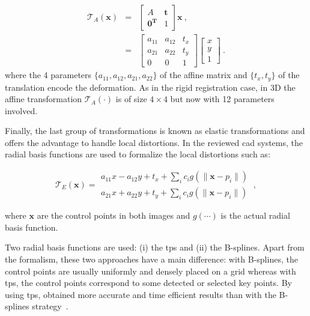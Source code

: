 \begin{eqnarray}
	\mathcal{T}_A(\mathbf{x}) & = & \begin{bmatrix}
		A & \mathbf{t} \\
		\mathbf{0^T} & 1
	\end{bmatrix} \mathbf{x} \ , \nonumber \\
	& = & \begin{bmatrix}
		a_{11} & a_{12} & t_x \\
		a_{21} & a_{22} & t_y \\
		0 & 0 & 1
	\end{bmatrix}\begin{bmatrix}
		x \\
		y \\
		1
	\end{bmatrix} \ . \label{eq:afftra}%
\end{eqnarray}
\noindent where the 4 parameters $\{a_{11},a_{12},a_{21},a_{22}\}$ of the affine matrix and $\{ t_x, t_y \}$ of the translation encode the deformation.
As in the rigid registration case, in 3D the affine transformation $\mathcal{T}_A(\cdot)$ is of size $4 \times 4$ but now with 12 parameters involved.

Finally, the last group of transformations is known as elastic transformations and offers the advantage to handle local distortions.
In the reviewed \ac{cad} systems, the radial basis functions are used to formalize the local distortions such as:

\begin{equation}
	\mathcal{T}_E(\mathbf{x}) = \begin{matrix}
	a_{11} x - a_{12} y + t_x + \sum_i c_i g(\| \mathbf{x} - p_i \|) \\
	a_{21} x + a_{22} y + t_y + \sum_i c_i g(\| \mathbf{x} - p_i \|)
	\end{matrix} \ ,
\end{equation}

\noindent where $\mathbf{x}$ are the control points in both images and $g(\cdots)$ is the actual radial basis function. 

Two radial basis functions are used: (i) the \ac{tps} and (ii) the B-splines.
Apart from the formalism, these two approaches have a main difference: with B-splines, the control points are usually uniformly and densely placed on a grid whereas with \ac{tps}, the control points correspond to some detected or selected key points.
By using \ac{tps}, \citeauthor{Mitra2011} obtained more accurate and time efficient results than with the B-splines strategy~\cite{Mitra2012a}.

